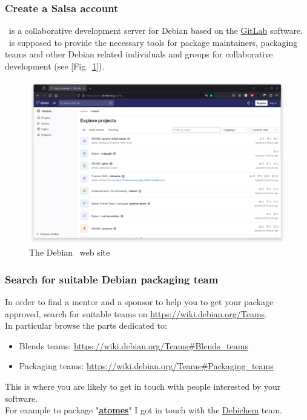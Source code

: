 \subsubsection{Create a Salsa account}

\salsa\ is a collaborative development server for Debian based on the \href{https://gitlab.com}{GitLab} software. 
\salsa\ is supposed to provide the necessary tools for package maintainers, packaging teams and other Debian related individuals and groups for collaborative development (see [Fig.~\ref{salsa}]).
\begin{figure}[!h]
\includegraphics[width=1.0\textwidth,keepaspectratio=true,draft=\ddst]{img/deb/salsa}
\caption{The Debian \salsa\ web site}\label{salsa}
\end{figure}

\subsubsection{Search for suitable Debian packaging team}

In order to find a mentor and a sponsor to help you to get your package approved, search for suitable teams on \href{https://wiki.debian.org/Teams}{https://wiki.debian.org/Teams}. \\
In particular browse the parts dedicated to:
\begin{itemize}
\item Blends teams: \href{https://wiki.debian.org/Teams\#Blends\_teams}{https://wiki.debian.org/Teams\#Blends\_teams}
\item Packaging teams: \href{https://wiki.debian.org/Teams\#Packaging\_teams}{https://wiki.debian.org/Teams\#Packaging\_teams}
\end{itemize}
This is where you are likely to get in touch with people interested by your software. \\
For example to package "\href{https://atomes.ipcms.fr}{\bf{atomes}}" I got in touch with the \href{https://wiki.debian.org/Debichem}{Debichem} team. 

